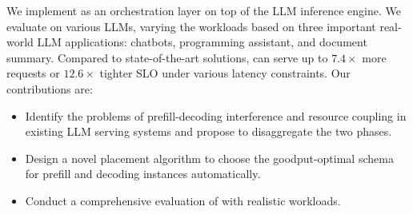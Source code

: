 We implement \sys as an orchestration layer on top of the LLM inference engine. We
evaluate \sys on various LLMs, varying the workloads based on three important real-world LLM applications: chatbots, programming assistant, and document summary. Compared to state-of-the-art solutions, \sys can serve up to $7.4\times$ more requests or $12.6\times$ tighter SLO under various latency constraints. Our contributions are:

\begin{itemize}
    \item Identify the problems of prefill-decoding interference and resource coupling in existing LLM serving systems and propose to disaggregate the two phases.
    \item Design a novel placement algorithm to choose the goodput-optimal schema for prefill and decoding instances automatically.
    \item Conduct a comprehensive evaluation of \sys with realistic workloads.
\end{itemize}
